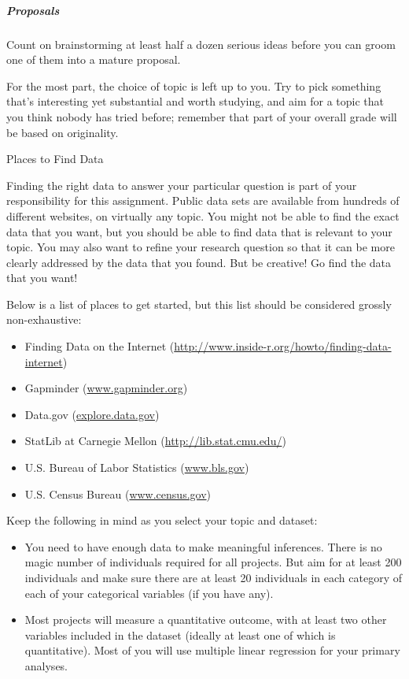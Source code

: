 \documentclass[]{article}
\let\oldsubparagraph\subparagraph
\renewcommand{\subparagraph}[1]{\oldsubparagraph{#1}\mbox{}}
\begin{document}
\subparagraph{Proposals}\label{proposals}

Count on brainstorming at least half a dozen serious ideas before you
can groom one of them into a mature proposal.

For the most part, the choice of topic is left up to you. Try to pick
something that's interesting yet substantial and worth studying, and aim
for a topic that you think nobody has tried before; remember that part
of your overall grade will be based on originality.

Places to Find Data

Finding the right data to answer your particular question is part of
your responsibility for this assignment. Public data sets are available
from hundreds of different websites, on virtually any topic. You might
not be able to find the exact data that you want, but you should be able
to find data that is relevant to your topic. You may also want to refine
your research question so that it can be more clearly addressed by the
data that you found. But be creative! Go find the data that you want!

Below is a list of places to get started, but this list should be
considered grossly non-exhaustive:

\begin{itemize}
\item
  Finding Data on the Internet
  (\url{http://www.inside-r.org/howto/finding-data-internet})
\item
  Gapminder (\url{www.gapminder.org})
\item
  Data.gov (\url{explore.data.gov})
\item
  StatLib at Carnegie Mellon (\url{http://lib.stat.cmu.edu/})
\item
  U.S. Bureau of Labor Statistics (\url{www.bls.gov})
\item
  U.S. Census Bureau (\url{www.census.gov})
\end{itemize}

Keep the following in mind as you select your topic and dataset:

\begin{itemize}
\item
  You need to have enough data to make meaningful inferences. There is
  no magic number of individuals required for all projects. But aim for
  at least 200 individuals and make sure there are at least 20
  individuals in each category of each of your categorical variables (if
  you have any).
\item
  Most projects will measure a quantitative outcome, with at least two
  other variables included in the dataset (ideally at least one of which
  is quantitative). Most of you will use multiple linear regression for
  your primary analyses.
\end{itemize}
\end{document}
